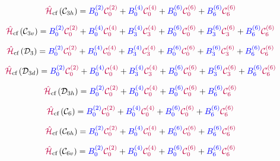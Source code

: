 \begin{equation}
\hamCrystalFieldSymbol\left(\groupSymbol{C}{3h}\right)  = \Bkq{2}{0} \Ckq{2}{0} + 
 \Bkq{4}{0} \Ckq{4}{0} + 
 \Bkq{6}{0} \Ckq{6}{0} + 
 \Bkq{6}{6} \Ckq{6}{6}
\label{eqn:cf:C3h}
\end{equation}


\begin{equation}
\hamCrystalFieldSymbol\left(\groupSymbol{C}{3v}\right)  = \Bkq{2}{0} \Ckq{2}{0} + 
 \Bkq{4}{0} \Ckq{4}{0} + 
 \Bkq{4}{3} \Ckq{4}{3} + 
 \Bkq{6}{0} \Ckq{6}{0} + 
 \Bkq{6}{3} \Ckq{6}{3} + 
 \Bkq{6}{6} \Ckq{6}{6}
\label{eqn:cf:C3v}
\end{equation}


\begin{equation}
\hamCrystalFieldSymbol\left(\groupSymbol{D}{3}\right)  = \Bkq{2}{0} \Ckq{2}{0} + 
 \Bkq{4}{0} \Ckq{4}{0} + 
 \Bkq{4}{3} \Ckq{4}{3} + 
 \Bkq{6}{0} \Ckq{6}{0} + 
 \Bkq{6}{3} \Ckq{6}{3} + 
 \Bkq{6}{6} \Ckq{6}{6}
\label{eqn:cf:D3}
\end{equation}


\begin{equation}
\hamCrystalFieldSymbol\left(\groupSymbol{D}{3d}\right)  = \Bkq{2}{0} \Ckq{2}{0} + 
 \Bkq{4}{0} \Ckq{4}{0} + 
 \Bkq{4}{3} \Ckq{4}{3} + 
 \Bkq{6}{0} \Ckq{6}{0} + 
 \Bkq{6}{3} \Ckq{6}{3} + 
 \Bkq{6}{6} \Ckq{6}{6}
\label{eqn:cf:D3d}
\end{equation}


\begin{equation}
\hamCrystalFieldSymbol\left(\groupSymbol{D}{3h}\right)  = \Bkq{2}{0} \Ckq{2}{0} + 
 \Bkq{4}{0} \Ckq{4}{0} + 
 \Bkq{6}{0} \Ckq{6}{0} + 
 \Bkq{6}{6} \Ckq{6}{6}
\label{eqn:cf:D3h}
\end{equation}


\begin{equation}
\hamCrystalFieldSymbol\left(\groupSymbol{C}{6}\right)  = \Bkq{2}{0} \Ckq{2}{0} + 
 \Bkq{4}{0} \Ckq{4}{0} + 
 \Bkq{6}{0} \Ckq{6}{0} + 
 \Bkq{6}{6} \Ckq{6}{6}
\label{eqn:cf:C6}
\end{equation}


\begin{equation}
\hamCrystalFieldSymbol\left(\groupSymbol{C}{6h}\right)  = \Bkq{2}{0} \Ckq{2}{0} + 
 \Bkq{4}{0} \Ckq{4}{0} + 
 \Bkq{6}{0} \Ckq{6}{0} + 
 \Bkq{6}{6} \Ckq{6}{6}
\label{eqn:cf:C6h}
\end{equation}


\begin{equation}
\hamCrystalFieldSymbol\left(\groupSymbol{C}{6v}\right)  = \Bkq{2}{0} \Ckq{2}{0} + 
 \Bkq{4}{0} \Ckq{4}{0} + 
 \Bkq{6}{0} \Ckq{6}{0} + 
 \Bkq{6}{6} \Ckq{6}{6}
\label{eqn:cf:C6v}
\end{equation}


